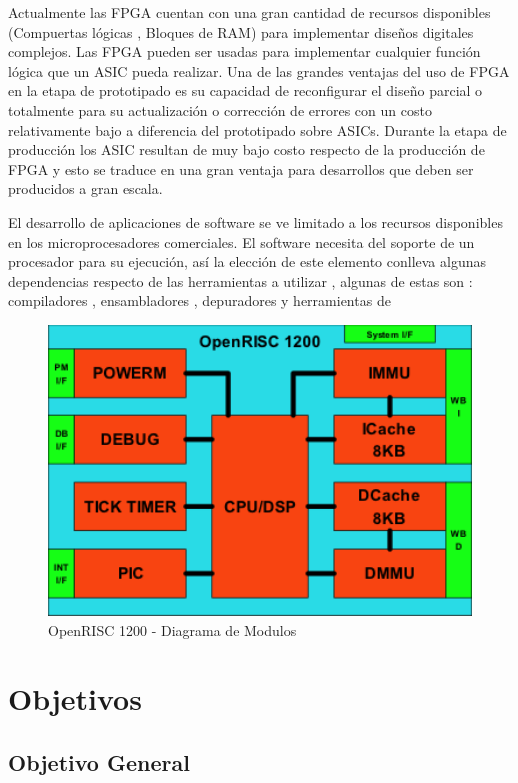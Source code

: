  Actualmente las FPGA cuentan con una gran cantidad de recursos disponibles
(Compuertas lógicas , Bloques de RAM) para implementar diseños digitales
complejos. Las FPGA pueden ser usadas para implementar cualquier función lógica
que un ASIC  pueda realizar. Una de las grandes ventajas del uso de FPGA en la
etapa de prototipado es su capacidad de reconfigurar el diseño parcial o
totalmente para su actualización o corrección de errores con un costo
relativamente bajo a diferencia del prototipado sobre ASICs. Durante la etapa
de producción los  ASIC resultan de muy bajo costo respecto de la producción de
FPGA y esto se traduce en una gran ventaja para desarrollos que deben ser
producidos a gran escala.

El desarrollo de aplicaciones de software se ve limitado a los recursos
disponibles en los microprocesadores comerciales. El software necesita del
soporte de un procesador para su ejecución, así la elección de este elemento
conlleva algunas dependencias respecto de las herramientas a utilizar , algunas
de estas son : compiladores , ensambladores , depuradores y herramientas de



\begin{figure}
\centerline{
        \includegraphics[width=12cm]{images/OR1200.png}
}
\caption{OpenRISC 1200 - Diagrama de Modulos}
\end{figure}

\section{Objetivos}
\subsection{Objetivo General}

